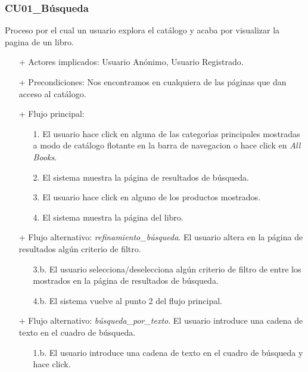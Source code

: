 \documentclass[a4paper]{report}
\begin{document}
            \subsubsection{CU01\_Búsqueda}
            Proceso por el cual un usuario explora el cat\'alogo y acaba por visualizar la pagina de un libro.
            \begin{itemize}
                \item[+] Actores implicados: Usuario An\'onimo, Usuario Registrado.
                \item[+] Precondiciones: Nos encontramos en cualquiera de las p\'aginas que dan acceso al cat\'alogo.
                \item[+] Flujo principal:
                \begin{enumerate}
                    \item[1.] El usuario hace click en alguna de las categor\'\i{}as principales mostradas a modo de cat\'alogo flotante en la barra de navegacion
                    o hace click en \emph{All Books}.
                    \item[2.] El sistema muestra la p\'agina de resultados de b\'usqueda.
                    \item[3.] El usuario hace click en alguno de los productos mostrados.
                    \item[4.] El sistema muestra la p\'agina del libro.
                \end{enumerate}
                \item[+] Flujo alternativo: \emph{refinamiento\_b\'usqueda}. El usuario altera en la p\'agina de resultados alg\'un criterio de filtro.
                \begin{itemize}
                    \item[3.b.] El usuario selecciona/deselecciona alg\'un criterio de filtro de entre los mostrados en la p\'agina de resultados de b\'usqueda.
                    \item[4.b.] El sistema vuelve al punto 2 del flujo principal.
                \end{itemize}
                \item[+] Flujo alternativo: \emph{b\'usqueda\_por\_texto}. El usuario introduce una cadena de texto en el cuadro de b\'usqueda.
                \begin{itemize}
                    \item[1.b.] El usuario introduce una cadena de texto en el cuadro de b\'usqueda y hace click.
                \end{itemize}
            \end{itemize}
\end{document}
